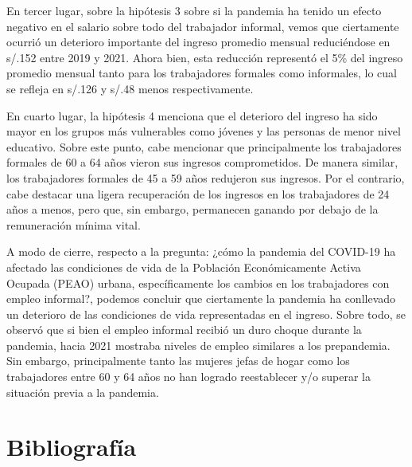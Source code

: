 \documentclass[
  letterpaper,
  12pt,
  oneside,
  spanish,
  doublespacing,
  headsepline,
  parskip]{MastersDoctoralThesis}
\begin{document}
En tercer lugar, sobre la hipótesis 3 sobre si la pandemia ha tenido un
efecto negativo en el salario sobre todo del trabajador informal, vemos
que ciertamente ocurrió un deterioro importante del ingreso promedio
mensual reduciéndose en s/.152 entre 2019 y 2021. Ahora bien, esta
reducción representó el 5\% del ingreso promedio mensual tanto para los
trabajadores formales como informales, lo cual se refleja en s/.126 y
s/.48 menos respectivamente.

En cuarto lugar, la hipótesis 4 menciona que el deterioro del ingreso ha
sido mayor en los grupos más vulnerables como jóvenes y las personas de
menor nivel educativo. Sobre este punto, cabe mencionar que
principalmente los trabajadores formales de 60 a 64 años vieron sus
ingresos comprometidos. De manera similar, los trabajadores formales de
45 a 59 años redujeron sus ingresos. Por el contrario, cabe destacar una
ligera recuperación de los ingresos en los trabajadores de 24 años a
menos, pero que, sin embargo, permanecen ganando por debajo de la
remuneración mínima vital.

A modo de cierre, respecto a la pregunta: ¿cómo la pandemia del COVID-19
ha afectado las condiciones de vida de la Población Económicamente
Activa Ocupada (PEAO) urbana, específicamente los cambios en los
trabajadores con empleo informal?, podemos concluir que ciertamente la
pandemia ha conllevado un deterioro de las condiciones de vida
representadas en el ingreso. Sobre todo, se observó que si bien el
empleo informal recibió un duro choque durante la pandemia, hacia 2021
mostraba niveles de empleo similares a los prepandemia. Sin embargo,
principalmente tanto las mujeres jefas de hogar como los trabajadores
entre 60 y 64 años no han logrado reestablecer y/o superar la situación
previa a la pandemia.


\hypertarget{bibliografuxeda}{%
\chapter*{Bibliografía}\label{bibliografuxeda}}

\end{document}
